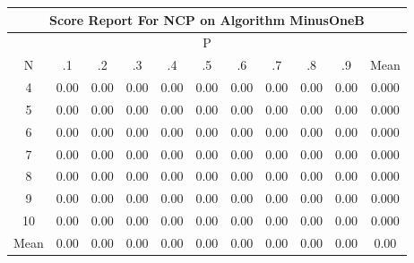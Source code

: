 \documentclass[11pt,a4paper]{report}
\begin{document}
\begin{longtable}{ | c || c | c | c | c | c | c | c | c | c || c |}
\hline
\multicolumn{11}{|c|}{ Score Report For NCP on Algorithm MinusOneB} \\
\hline
\multicolumn{11}{|c|}{ P } \\
\hline
N & .1 & .2 & .3 & .4 & .5 & .6 & .7 & .8 & .9 & Mean\\
 \hline
 \hline
 \endhead
  4 &  \cellcolor[HTML]{FFFFFF} 0.00 &  \cellcolor[HTML]{FFFFFF} 0.00 &  \cellcolor[HTML]{FFFFFF} 0.00 &  \cellcolor[HTML]{FFFFFF} 0.00 &  \cellcolor[HTML]{FFFFFF} 0.00 &  \cellcolor[HTML]{FFFFFF} 0.00 &  \cellcolor[HTML]{FFFFFF} 0.00 &  \cellcolor[HTML]{FFFFFF} 0.00 &  \cellcolor[HTML]{FFFFFF} 0.00 & 0.000 \\
  5 &  \cellcolor[HTML]{FFFFFF} 0.00 &  \cellcolor[HTML]{FFFFFF} 0.00 &  \cellcolor[HTML]{FFFFFF} 0.00 &  \cellcolor[HTML]{FFFFFF} 0.00 &  \cellcolor[HTML]{FFFFFF} 0.00 &  \cellcolor[HTML]{FFFFFF} 0.00 &  \cellcolor[HTML]{FFFFFF} 0.00 &  \cellcolor[HTML]{FFFFFF} 0.00 &  \cellcolor[HTML]{FFFFFF} 0.00 & 0.000 \\
  6 &  \cellcolor[HTML]{FFFFFF} 0.00 &  \cellcolor[HTML]{FFFFFF} 0.00 &  \cellcolor[HTML]{FFFFFF} 0.00 &  \cellcolor[HTML]{FFFFFF} 0.00 &  \cellcolor[HTML]{FFFFFF} 0.00 &  \cellcolor[HTML]{FFFFFF} 0.00 &  \cellcolor[HTML]{FFFFFF} 0.00 &  \cellcolor[HTML]{FFFFFF} 0.00 &  \cellcolor[HTML]{FFFFFF} 0.00 & 0.000 \\
  7 &  \cellcolor[HTML]{FFFFFF} 0.00 &  \cellcolor[HTML]{FFFFFF} 0.00 &  \cellcolor[HTML]{FFFFFF} 0.00 &  \cellcolor[HTML]{FFFFFF} 0.00 &  \cellcolor[HTML]{FFFFFF} 0.00 &  \cellcolor[HTML]{FFFFFF} 0.00 &  \cellcolor[HTML]{FFFFFF} 0.00 &  \cellcolor[HTML]{FFFFFF} 0.00 &  \cellcolor[HTML]{FFFFFF} 0.00 & 0.000 \\
  8 &  \cellcolor[HTML]{FFFFFF} 0.00 &  \cellcolor[HTML]{FFFFFF} 0.00 &  \cellcolor[HTML]{FFFFFF} 0.00 &  \cellcolor[HTML]{FFFFFF} 0.00 &  \cellcolor[HTML]{FFFFFF} 0.00 &  \cellcolor[HTML]{FFFFFF} 0.00 &  \cellcolor[HTML]{FFFFFF} 0.00 &  \cellcolor[HTML]{FFFFFF} 0.00 &  \cellcolor[HTML]{FFFFFF} 0.00 & 0.000 \\
  9 &  \cellcolor[HTML]{FFFFFF} 0.00 &  \cellcolor[HTML]{FFFFFF} 0.00 &  \cellcolor[HTML]{FFFFFF} 0.00 &  \cellcolor[HTML]{FFFFFF} 0.00 &  \cellcolor[HTML]{FFFFFF} 0.00 &  \cellcolor[HTML]{FFFFFF} 0.00 &  \cellcolor[HTML]{FFFFFF} 0.00 &  \cellcolor[HTML]{FFFFFF} 0.00 &  \cellcolor[HTML]{FFFFFF} 0.00 & 0.000 \\
  10 &  \cellcolor[HTML]{FFFFFF} 0.00 &  \cellcolor[HTML]{FFFFFF} 0.00 &  \cellcolor[HTML]{FFFFFF} 0.00 &  \cellcolor[HTML]{FFFFFF} 0.00 &  \cellcolor[HTML]{FFFFFF} 0.00 &  \cellcolor[HTML]{FFFFFF} 0.00 &  \cellcolor[HTML]{FFFFFF} 0.00 &  \cellcolor[HTML]{FFFFFF} 0.00 &  \cellcolor[HTML]{FFFFFF} 0.00 & 0.000 \\
 \hline
 \hline
Mean &  \cellcolor[HTML]{FFFFFF} 0.00 &  \cellcolor[HTML]{FFFFFF} 0.00 &  \cellcolor[HTML]{FFFFFF} 0.00 &  \cellcolor[HTML]{FFFFFF} 0.00 &  \cellcolor[HTML]{FFFFFF} 0.00 &  \cellcolor[HTML]{FFFFFF} 0.00 &  \cellcolor[HTML]{FFFFFF} 0.00 &  \cellcolor[HTML]{FFFFFF} 0.00 &  \cellcolor[HTML]{FFFFFF} 0.00 &  \cellcolor[HTML]{FFFFFF} 0.00
\end{longtable}
\end{document}

